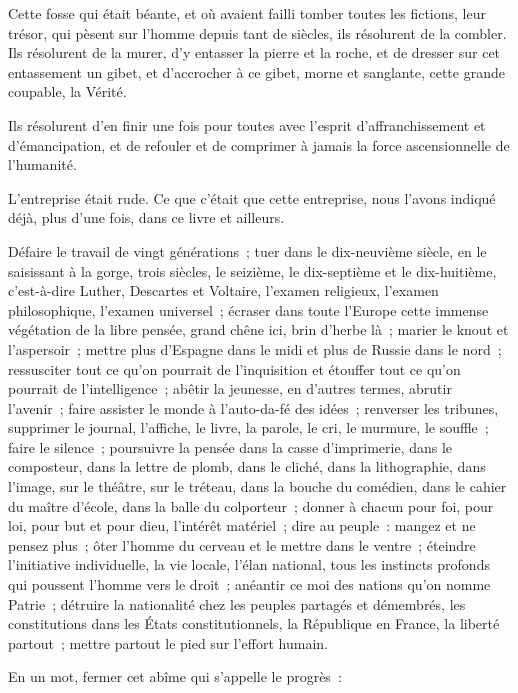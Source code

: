 \documentclass[french,twoside]{book} %
\begin{document}
Cette fosse qui était béante, et où avaient failli tomber toutes les fictions, leur trésor, qui pèsent sur l’homme depuis tant de siècles, ils résolurent de la combler. Ils résolurent de la murer, d’y entasser la pierre et la roche, et de dresser sur cet entassement un gibet, et d’accrocher à ce gibet, morne et sanglante, cette grande coupable, la Vérité.\par
Ils résolurent d’en finir une fois pour toutes avec l’esprit d’affranchissement et d’émancipation, et de refouler et de comprimer à jamais la force ascensionnelle de l’humanité.\par
L’entreprise était rude. Ce que c’était que cette entreprise, nous l’avons indiqué déjà, plus d’une fois, dans ce livre et ailleurs.\par
Défaire le travail de vingt générations ; tuer dans le dix-neuvième siècle, en le saisissant à la gorge, trois siècles, le seizième, le dix-septième et le dix-huitième, c’est-à-dire Luther, Descartes et Voltaire, l’examen religieux, l’examen philosophique, l’examen universel ; écraser dans toute l’Europe cette immense végétation de la libre pensée, grand chêne ici, brin d’herbe là ; marier le knout et l’aspersoir ; mettre plus d’Espagne dans le midi et plus de Russie dans le nord ; ressusciter tout ce qu’on pourrait de l’inquisition et étouffer tout ce qu’on pourrait de l’intelligence ; abêtir la jeunesse, en d’autres termes, abrutir l’avenir ; faire assister le monde à l’auto-da-fé des idées ; renverser les tribunes, supprimer le journal, l’affiche, le livre, la parole, le cri, le murmure, le souffle ; faire le silence ; poursuivre la pensée dans la casse d’imprimerie, dans le composteur, dans la lettre de plomb, dans le cliché, dans la lithographie, dans l’image, sur le théâtre, sur le tréteau, dans la bouche du comédien, dans le cahier du maître d’école, dans la balle du colporteur ; donner à chacun pour foi, pour loi, pour but et pour dieu, l’intérêt matériel ; dire au peuple : mangez et ne pensez plus ; ôter l’homme du cerveau et le mettre dans le ventre ; éteindre l’initiative individuelle, la vie locale, l’élan national, tous les instincts profonds qui poussent l’homme vers le droit ; anéantir ce moi des nations qu’on nomme Patrie ; détruire la nationalité chez les peuples partagés et démembrés, les constitutions dans les États constitutionnels, la République en France, la liberté partout ; mettre partout le pied sur l’effort humain.\par
En un mot, fermer cet abîme qui s’appelle le progrès :\par
\end{document}
